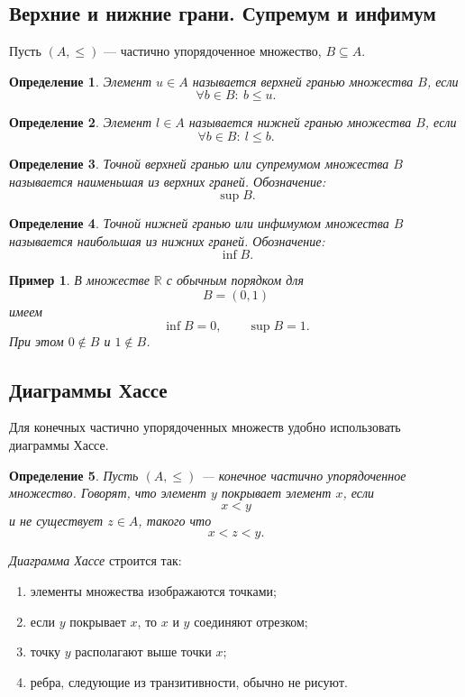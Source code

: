 \documentclass[12pt,a4paper]{article}
\newtheorem{definition}{Определение}
\newtheorem{example}{Пример}
\begin{document}
\subsection{Верхние и нижние грани. Супремум и инфимум}

Пусть $(A,\leq)$ --- частично упорядоченное множество, $B\subseteq A$.

\begin{definition}
Элемент $u\in A$ называется \emph{верхней гранью} множества $B$, если
\[
\forall b\in B:\ b\leq u.
\]
\end{definition}

\begin{definition}
Элемент $l\in A$ называется \emph{нижней гранью} множества $B$, если
\[
\forall b\in B:\ l\leq b.
\]
\end{definition}

\begin{definition}
\emph{Точной верхней гранью} или \emph{супремумом} множества $B$ называется наименьшая из верхних граней.
Обозначение:
\[
\sup B.
\]
\end{definition}

\begin{definition}
\emph{Точной нижней гранью} или \emph{инфимумом} множества $B$ называется наибольшая из нижних граней.
Обозначение:
\[
\inf B.
\]
\end{definition}

\begin{example}
В множестве $\mathbb R$ с обычным порядком для
\[
B=(0,1)
\]
имеем
\[
\inf B=0,
\qquad
\sup B=1.
\]
При этом $0\notin B$ и $1\notin B$.
\end{example}

\subsection{Диаграммы Хассе}

Для конечных частично упорядоченных множеств удобно использовать диаграммы Хассе.

\begin{definition}
Пусть $(A,\leq)$ --- конечное частично упорядоченное множество.
Говорят, что элемент $y$ \emph{покрывает} элемент $x$, если
\[
x<y
\]
и не существует $z\in A$, такого что
\[
x<z<y.
\]
\end{definition}

\emph{Диаграмма Хассе} строится так:
\begin{enumerate}
\item элементы множества изображаются точками;
\item если $y$ покрывает $x$, то $x$ и $y$ соединяют отрезком;
\item точку $y$ располагают выше точки $x$;
\item ребра, следующие из транзитивности, обычно не рисуют.
\end{enumerate}
\end{document}
